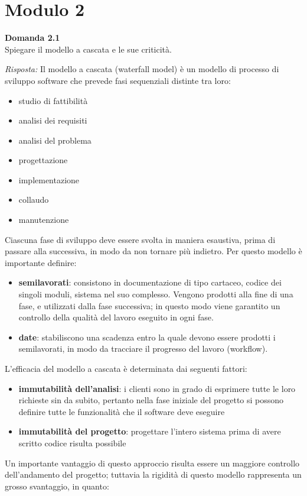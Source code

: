 \documentclass{article}
\newenvironment{problem}[2][Domanda]
    { \begin{mdframed}[backgroundcolor=gray!20] \textbf{#1 #2} \\}
    {  \end{mdframed}}
\newenvironment{solution}
    {\textit{Risposta:}}
    {}
\begin{document}
\section{Modulo 2}
\begin{problem}{2.1}
Spiegare il modello a cascata e le sue criticità.
\end{problem}
\begin{solution}
Il modello a cascata (waterfall model) è un modello di processo di sviluppo software che prevede fasi sequenziali distinte tra loro:
\begin{itemize}
	\item studio di fattibilità
	\item analisi dei requisiti
	\item analisi del problema
	\item progettazione
	\item implementazione
	\item collaudo
	\item manutenzione
\end{itemize}
Ciascuna fase di sviluppo deve essere svolta in maniera esaustiva, prima di passare alla successiva, in modo da non tornare più indietro.
Per questo modello è importante definire:
\begin{itemize}
	\item \textbf{semilavorati}: consistono in documentazione di tipo cartaceo, codice dei singoli moduli, sistema nel suo complesso.\newline
	Vengono prodotti alla fine di una fase, e utilizzati dalla fase successiva; in questo modo viene garantito un controllo della qualità del lavoro eseguito in ogni fase.
	\item \textbf{date}: stabiliscono una scadenza entro la quale devono essere prodotti i semilavorati, in modo da tracciare il progresso del lavoro (workflow).
\end{itemize}
L'efficacia del modello a cascata è determinata dai seguenti fattori:
\begin{itemize}
	\item \textbf{immutabilità dell'analisi}: i clienti sono in grado di esprimere tutte le loro richieste sin da subito, pertanto nella fase iniziale del progetto si possono definire tutte le funzionalità che il software deve eseguire
	\item \textbf{immutabilità del progetto}: progettare l'intero sistema prima di avere scritto codice risulta possibile
\end{itemize}
Un importante vantaggio di questo approccio risulta essere un maggiore controllo dell'andamento del progetto; tuttavia la rigidità di questo modello rappresenta un grosso svantaggio, in quanto:

\end{solution}
\end{document}
